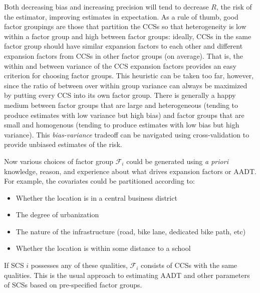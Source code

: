 \documentclass[11pt]{article}
\providecommand{\tightlist}{%
      \setlength{\itemsep}{0pt}\setlength{\parskip}{0pt}}
\begin{document}
Both decreasing bias and increasing precision will tend to decrease
\(R\), the risk of the estimator, improving estimates in expectation. As
a rule of thumb, good factor groupings are those that partition the CCSs
so that heterogeneity is low within a factor group and high between
factor groups: ideally, CCSs in the same factor group should have
similar expansion factors to each other and different expansion factors
from CCSs in other factor groups (on average). That is, the within and
between variance of the CCS expansion factors provides an easy criterion
for choosing factor groups. This heuristic can be taken too far,
however, since the ratio of between over within group variance can
always be maximized by putting every CCS into its own factor group.
There is generally a happy medium between factor groups that are large
and heterogeneous (tending to produce estimates with low variance but
high bias) and factor groups that are small and homogenous (tending to
produce estimates with low bias but high variance). This
\emph{bias-variance} tradeoff can be navigated using cross-validation to
provide unbiased estimates of the risk.

Now various choices of factor group \(\mathcal{F}_i\) could be generated
using \emph{a priori} knowledge, reason, and experience about what
drives expansion factors or AADT. For example, the covariates could be
partitioned according to:

\begin{itemize}
\tightlist
\item
  Whether the location is in a central business district
\item
  The degree of urbanization
\item
  The nature of the infrastructure (road, bike lane, dedicated bike
  path, etc)
\item
  Whether the location is within some distance to a school
\end{itemize}

If SCS \(i\) possesses any of these qualities, \(\mathcal{F}_i\)
consists of CCSs with the same qualities. This is the usual approach to
estimating AADT and other parameters of SCSs based on pre-specified
factor groups.
\end{document}
